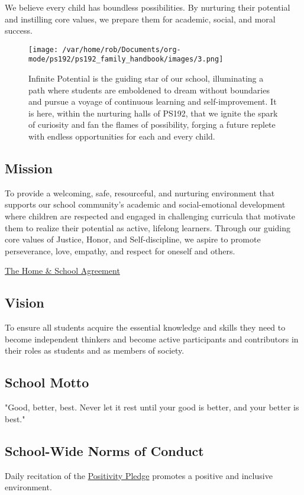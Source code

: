 \documentclass[11pt]{article}
\begin{document}
We believe every child has boundless possibilities. By nurturing their potential and instilling core values, we prepare them for academic, social, and moral success.

\begin{figure}[htbp]
\centering
\texttt{[image: /var/home/rob/Documents/org-mode/ps192/ps192\_family\_handbook/images/3.png]}
\caption{Infinite Potential is the guiding star of our school, illuminating a path where students are emboldened to dream without boundaries and pursue a voyage of continuous learning and self-improvement. It is here, within the nurturing halls of PS192, that we ignite the spark of curiosity and fan the flames of possibility, forging a future replete with endless opportunities for each and every child.}
\end{figure}

\subsection{Mission}
\label{sec:orgf4bbf46}
To provide a welcoming, safe, resourceful, and nurturing environment that supports our school community's academic and social-emotional development where children are respected and engaged in challenging curricula that motivate them to realize their potential as active, lifelong learners. Through our guiding core values of Justice, Honor, and Self-discipline, we aspire to promote perseverance, love, empathy, and respect for oneself and others.

\href{https://4.files.edl.io/d109/09/17/23/012751-34dac161-8e19-4033-8c6b-f369007cab02.pdf}{The Home \& School Agreement}

\subsection{Vision}
\label{sec:org0389967}
To ensure all students acquire the essential knowledge and skills they need to become independent thinkers and become active participants and contributors in their roles as students and as members of society.

\subsection{School Motto}
\label{sec:org6bc67e9}

"Good, better, best. Never let it rest until your good is better, and your better is best."

\subsection{School-Wide Norms of Conduct}
\label{sec:org4d67c8b}
Daily recitation of the \href{https://www.ps192.org/apps/pages/index.jsp?uREC\_ID=1504973\&type=d\&pREC\_ID=2371090}{Positivity Pledge} promotes a positive and inclusive environment.
\end{document}
